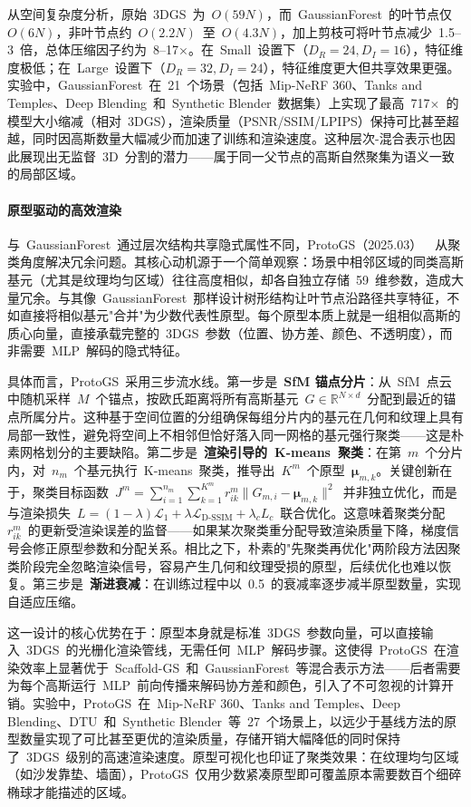 从空间复杂度分析，原始~3DGS~为~$O(59N)$，而~GaussianForest~的叶节点仅~$O(6N)$，非叶节点约~$O(2.2N)$~至~$O(4.3N)$，加上剪枝可将叶节点减少~1.5--3~倍，总体压缩因子约为~8--17$\times$。在~Small~设置下（$D_R=24, D_I=16$），特征维度极低；在~Large~设置下（$D_R=32, D_I=24$），特征维度更大但共享效果更强。实验中，GaussianForest~在~21~个场景（包括~Mip-NeRF 360、Tanks and Temples、Deep Blending~和~Synthetic Blender~数据集）上实现了最高~717$\times$~的模型大小缩减（相对~3DGS），渲染质量（PSNR/SSIM/LPIPS）保持可比甚至超越，同时因高斯数量大幅减少而加速了训练和渲染速度。这种层次-混合表示也因此展现出无监督~3D~分割的潜力——属于同一父节点的高斯自然聚集为语义一致的局部区域。

\paragraph{原型驱动的高效渲染}

与~GaussianForest~通过层次结构共享隐式属性不同，ProtoGS（2025.03）~\cite{2503_17486}~从聚类角度解决冗余问题。其核心动机源于一个简单观察：场景中相邻区域的同类高斯基元（尤其是纹理均匀区域）往往高度相似，却各自独立存储~59~维参数，造成大量冗余。与其像~GaussianForest~那样设计树形结构让叶节点沿路径共享特征，不如直接将相似基元"合并"为少数代表性原型。每个原型本质上就是一组相似高斯的质心向量，直接承载完整的~3DGS~参数（位置、协方差、颜色、不透明度），而非需要~MLP~解码的隐式特征。

具体而言，ProtoGS~采用三步流水线。第一步是~\textbf{SfM 锚点分片}：从~SfM~点云中随机采样~$M$~个锚点，按欧氏距离将所有高斯基元~$G \in \mathbb{R}^{N \times d}$~分配到最近的锚点所属分片。这种基于空间位置的分组确保每组分片内的基元在几何和纹理上具有局部一致性，避免将空间上不相邻但恰好落入同一网格的基元强行聚类——这是朴素网格划分的主要缺陷。第二步是~\textbf{渲染引导的~K-means~聚类}：在第~$m$~个分片内，对~$n_m$~个基元执行~K-means~聚类，推导出~$K^m$~个原型~$\bm{\mu}_{m,k}$。关键创新在于，聚类目标函数~$J^m = \sum_{i=1}^{n_m} \sum_{k=1}^{K^m} r_{ik}^m \|G_{m,i} - \bm{\mu}_{m,k}\|^2$~并非独立优化，而是与渲染损失~$L = (1-\lambda)\mathcal{L}_1 + \lambda \mathcal{L}_{\text{D-SSIM}} + \lambda_c L_c$~联合优化。这意味着聚类分配~$r_{ik}^m$~的更新受渲染误差的监督——如果某次聚类重分配导致渲染质量下降，梯度信号会修正原型参数和分配关系。相比之下，朴素的"先聚类再优化"两阶段方法因聚类阶段完全忽略渲染信号，容易产生几何和纹理受损的原型，后续优化也难以恢复。第三步是~\textbf{渐进衰减}：在训练过程中以~0.5~的衰减率逐步减半原型数量，实现自适应压缩。

这一设计的核心优势在于：原型本身就是标准~3DGS~参数向量，可以直接输入~3DGS~的光栅化渲染管线，无需任何~MLP~解码步骤。这使得~ProtoGS~在渲染效率上显著优于~Scaffold-GS~和~GaussianForest~等混合表示方法——后者需要为每个高斯运行~MLP~前向传播来解码协方差和颜色，引入了不可忽视的计算开销。实验中，ProtoGS~在~Mip-NeRF 360、Tanks and Temples、Deep Blending、DTU~和~Synthetic Blender~等~27~个场景上，以远少于基线方法的原型数量实现了可比甚至更优的渲染质量，存储开销大幅降低的同时保持了~3DGS~级别的高速渲染速度。原型可视化也印证了聚类效果：在纹理均匀区域（如沙发靠垫、墙面），ProtoGS~仅用少数紧凑原型即可覆盖原本需要数百个细碎椭球才能描述的区域。

